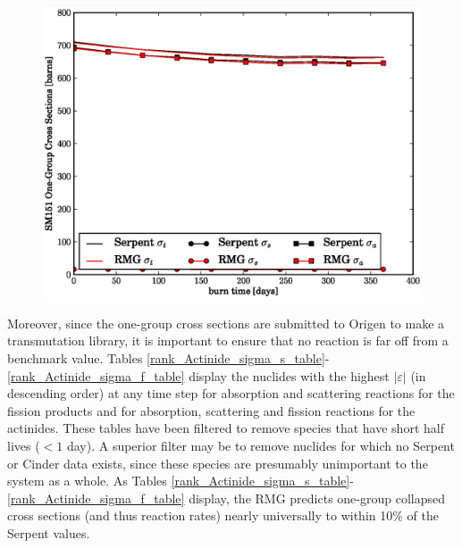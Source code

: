 \begin{figure}[htbp]
\begin{center}
\includegraphics[scale=0.3]{multigroup_method/figs/benchmark/SM151_1g_xs.eps}
\end{center}
\end{figure}

Moreover, since the one-group cross sections are submitted to Origen to make a transmutation library, 
it is important to ensure that no reaction is far off from a benchmark value.  Tables 
\ref{rank_Actinide_sigma_s_table}-\ref{rank_Actinide_sigma_f_table} display the 
nuclides with the highest $|\varepsilon|$ (in descending order) at any time step for absorption and scattering
reactions for the fission products and for absorption, scattering and fission reactions for the actinides.
These tables have been filtered to remove species that have short half lives ($<1$ day).  A superior 
filter may be to remove nuclides for which no Serpent or Cinder data exists, since these species are 
presumably unimportant to the system as a whole.
As Tables \ref{rank_Actinide_sigma_s_table}-\ref{rank_Actinide_sigma_f_table} display, 
the RMG predicts one-group collapsed cross sections (and thus reaction rates) nearly universally to 
within 10\% of the Serpent values.







